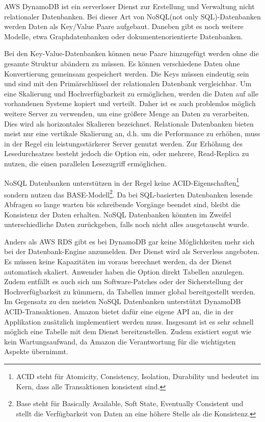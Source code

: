 AWS DynamoDB ist ein serverloser Dienst zur Erstellung und Verwaltung nicht relationaler Datenbanken.
Bei dieser Art von NoSQL(not only SQL)-Datenbanken werden Daten als Key/Value Paare aufgebaut. Daneben gibt es noch weitere Modelle, etwa Graphdatenbanken oder dokumentenorientierte
Datenbanken.

Bei den Key-Value-Datenbanken können neue Paare hinzugefügt werden ohne die gesamte Struktur abändern zu müssen.
Es können verschiedene Daten ohne Konvertierung gemeinsam gespeichert werden.
Die Keys müssen eindeutig sein und sind mit den Primärschlüssel der relationalen Datenbank vergleichbar.
Um eine Skalierung und Hochverfügbarkeit zu ermöglichen, werden die Daten auf alle vorhandenen Systeme kopiert und verteilt. Daher ist es auch problemlos möglich weitere
Server zu verwenden, um eine größere Menge an Daten zu verarbeiten. Dies wird als horizontales Skalieren bezeichnet.
Relationale Datenbanken bieten meist nur eine vertikale Skalierung an, d.h. um die Performance zu erhöhen, muss in der Regel ein leistungsstärkerer Server genutzt werden.
Zur Erhöhung des Lesedurchsatzes besteht jedoch die Option ein, oder mehrere, Read-Replica zu nutzen, die einen parallelen Lesezugriff ermöglichen.

NoSQL Datenbanken unterstützen in der Regel keine ACID-Eigenschaften\footnote{ACID steht für Atomicity, Consistency, Isolation, Durability und bedeutet im Kern, dass
alle Transaktionen konsistent sind.} sondern nutzen das BASE-Modell\footnote{Base steht für Basically Available, Soft State, Eventually Consistent und
stellt die Verfügbarkeit von Daten an eine höhere Stelle als die Konsistenz.}.
Da bei SQL-basierten Datenbanken lesende Abfragen so lange warten bis schreibende Vorgänge beendet sind, bleibt die Konsistenz der Daten erhalten.
NoSQL Datenbanken könnten im Zweifel unterschiedliche Daten zurückgeben, falls noch nicht alles ausgetauscht wurde. \cite[]{Datenbankvergleich}

Anders als AWS RDS gibt es bei DynamoDB gar keine Möglichkeiten mehr sich bei der Datenbank-Engine anzumelden. Der Dienst wird als Serverless angeboten.
Es müssen keine Kapazitäten im voraus berechnet werden, da der Dienst automatisch skaliert.
Anwender haben die Option direkt Tabellen anzulegen.
Zudem entfällt es auch sich um Software-Patches oder der Sicherstellung der Hochverfügbarkeit zu kümmern, da Tabellen immer global bereitgestellt werden.
Im Gegensatz zu den meisten NoSQL Datenbanken unterstützt DynamoDB ACID-Transaktionen. Amazon bietet dafür eine eigene API an, die in der Applikation zusätzlich
implementiert werden muss. Insgesamt ist es sehr schnell möglich eine Tabelle mit dem Dienst bereitzustellen. Zudem existiert sogut wie kein Wartungsaufwand,
da Amazon die Verantwortung für die wichtigsten Aspekte übernimmt.\cite[]{DynamoDB}

